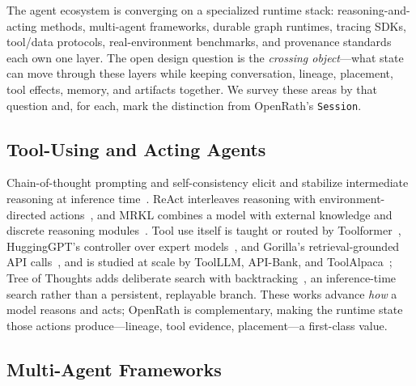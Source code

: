 
The agent ecosystem is converging on a specialized runtime stack: reasoning-and-acting
methods, multi-agent frameworks, durable graph runtimes, tracing SDKs, tool/data
protocols, real-environment benchmarks, and provenance standards each own one
layer. The open design question is the \emph{crossing object}---what state can
move through these layers while keeping conversation, lineage, placement, tool
effects, memory, and artifacts together. We survey these areas by that question
and, for each, mark the distinction from OpenRath's \texttt{Session}.

\subsection{Tool-Using and Acting Agents}

Chain-of-thought prompting and self-consistency elicit and stabilize
intermediate reasoning at inference time~\cite{cot,selfconsistency}. ReAct
interleaves reasoning with environment-directed actions~\cite{react}, and MRKL
combines a model with external knowledge and discrete reasoning
modules~\cite{mrkl}. Tool use itself is taught or routed by
Toolformer~\cite{toolformer}, HuggingGPT's controller over expert
models~\cite{hugginggpt}, and Gorilla's retrieval-grounded API
calls~\cite{gorilla}, and is studied at scale by ToolLLM, API-Bank, and
ToolAlpaca~\cite{toolllm,apibank,toolalpaca}; Tree of Thoughts adds deliberate
search with backtracking~\cite{tot}, an inference-time search rather than a
persistent, replayable branch. These works advance \emph{how} a model reasons
and acts; OpenRath is complementary, making the runtime state those actions
produce---lineage, tool evidence, placement---a first-class value.

\subsection{Multi-Agent Frameworks}

